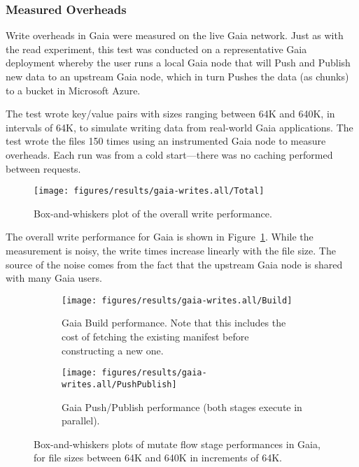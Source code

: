 \subsubsection{Measured Overheads}

Write overheads in Gaia were measured on the live Gaia network.  Just as with
the read experiment, this test was conducted on a representative Gaia deployment
whereby the user runs a local Gaia node that will Push and Publish new data to
an upstream Gaia node, which in turn Pushes the data (as chunks) to a bucket in
Microsoft Azure.

The test wrote key/value pairs with sizes ranging between 64K and 640K, in
intervals of 64K, to simulate writing
data from real-world Gaia applications.  The test wrote the files 150 times
using an instrumented Gaia node to measure overheads.  Each run was from a cold
start---there was no caching performed between requests.

\begin{figure}[htp!]
   \centering
   \texttt{[image: figures/results/gaia-writes.all/Total]}
   \caption{Box-and-whiskers plot of the overall write performance.}
   \label{fig:gaia-write-total}
\end{figure}

The overall write performance for Gaia is shown in
Figure~\ref{fig:gaia-write-total}.  While the measurement is noisy, the write
times increase linearly with the file size.  The source of the noise comes from
the fact that the upstream Gaia node is shared with many Gaia users.

\begin{figure}[htp!]
   \centering
   \begin{subfigure}[b]{.8\textwidth}
      \texttt{[image: figures/results/gaia-writes.all/Build]}
      \label{fig:gaia-write-build}
      \caption{Gaia Build performance.  Note that this includes the cost of
      fetching the existing manifest before constructing a new one.}
   \end{subfigure}
   \begin{subfigure}[b]{.8\textwidth}
      \texttt{[image: figures/results/gaia-writes.all/PushPublish]}
      \label{fig:gaia-write-pushpublish}
      \caption{Gaia Push/Publish performance (both stages execute in parallel).}
   \end{subfigure}
   \caption{Box-and-whiskers plots of mutate flow stage performances in Gaia,
   for file sizes between 64K and 640K in increments of 64K.}
   \label{fig:gaia-write-stages}
\end{figure}

